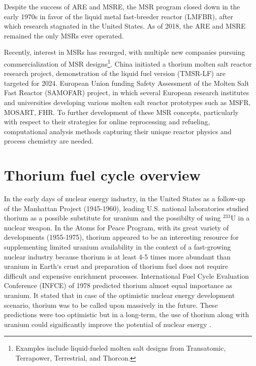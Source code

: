 Despite the success of \gls{ARE} and \gls{MSRE}, the \gls{MSR} program closed down in the early 1970s in favor of the liquid metal fast-breeder reactor (LMFBR),\cite{macpherson_molten_1985} after which research stagnated in the United States. As of 2018, the \gls{ARE} and \gls{MSRE} remained the only \glspl{MSR} ever operated.

Recently, interest in \glspl{MSR} has resurged, with multiple new companies pursuing commercialization of \gls{MSR} designs\footnote{Examples include liquid-fueled molten salt designs from Transatomic, Terrapower, Terrestrial, and Thorcon.}. China initiated a thorium molten salt reactor research project, demonstration of the liquid fuel version (TMSR-LF) are targeted for 2024. European Union funding Safety Assessment of the Molten Salt Fast Reactor (SAMOFAR) project, in which several European research institutes and universities developing various molten salt reactor prototypes such as \gls{MSFR}, \gls{MOSART}, \gls{FHR}.
To further development of these \gls{MSR} concepts, particularly with respect to their strategies for online reprocessing and refueling, computational analysis methods capturing their unique reactor physics and process chemistry are needed.

\section{Thorium fuel cycle overview}
In the early days of nuclear energy industry, in the United States as a follow-up of the Manhattan Project (1945-1960), leading U.S. national laboratories studied thorium as a possible substitute for uranium and the possibilty of using $^{233}$U in a nuclear weapon. In the Atoms for Peace Program, with its great variety of developments (1955-1975), thorium appeared to be an interesting resource for supplementing limited uranium availability in the context of a fast-growing nuclear industry because thorium is  at least 4-5 times more abundant than uranium in Earth`s crust and preparation of thorium fuel does not require difficult and expensive enrichment processes. International Fuel Cycle Evaluation Conference (INFCE) of 1978 predicted thorium almost equal importance as uranium. It stated that in case of the optimistic nuclear energy development scenario, thorium was to be called upon massively in the future. These predictions were too optimistic but in a long-term, the use of thorium along with uranium could significantly improve the potential of nuclear energy \cite{lung_perspectives_1998}.

